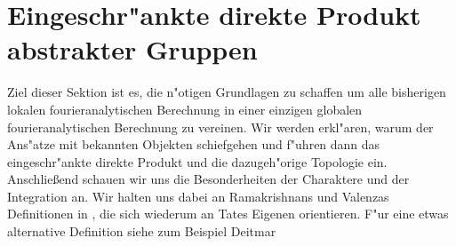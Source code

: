 \section{Eingeschr"ankte direkte Produkt abstrakter Gruppen}
	Ziel dieser Sektion ist es, die n"otigen Grundlagen zu schaffen um alle bisherigen lokalen fourieranalytischen Berechnung in einer einzigen globalen fourieranalytischen Berechnung zu vereinen. 
	Wir werden erkl"aren, warum der Ans"atze mit bekannten Objekten schiefgehen und f"uhren dann das eingeschr"ankte direkte Produkt und die dazugeh"orige Topologie ein.
	Anschließend schauen wir uns die Besonderheiten der Charaktere und der Integration an. 
	Wir halten uns dabei an Ramakrishnans und Valenzas Definitionen in \cite{rama}, die sich wiederum an Tates Eigenen orientieren.
	F"ur eine etwas alternative Definition siehe zum Beispiel Deitmar \cite{deitmar2010}
